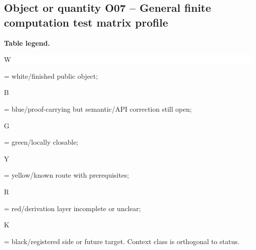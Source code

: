 \subsection*{Object or quantity O07 -- General finite computation test matrix profile}
\hypertarget{objproof:O07}{}
\par\smallskip\noindent\begin{minipage}{0.99\linewidth}\footnotesize\raggedright\textbf{Table legend.} \colorbox{white}{\strut W} = white/finished public object; \colorbox{cyan!20}{\strut B} = blue/proof-carrying but semantic/API correction still open; \colorbox{green!18}{\strut G} = green/locally closable; \colorbox{yellow!25}{\strut Y} = yellow/known route with prerequisites; \colorbox{red!20}{\strut R} = red/derivation layer incomplete or unclear; \colorbox{black!18}{\strut K} = black/registered side or future target. Context class is orthogonal to status.\end{minipage}\par\vspace{0.25em}
